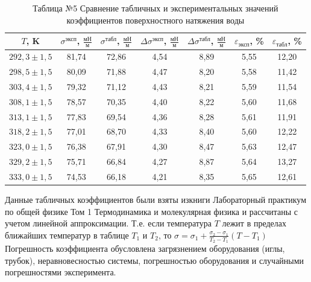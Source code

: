 \documentclass[a4paper]{article}
\begin{document}
\begin{table}[h!] 
	\caption{Таблица №5 Сравнение табличных и экспериментальных значений коэффициентов поверхностного натяжения воды}
	\begin{center}
		\begin{tabular}{|*{7}{c|}}
			\hline
			 $T$, K & $\sigma^{\text{эксп}}$, $\frac{\text{мН}}{\text{м}}$ & $\sigma^{\text{табл}}$, $\frac{\text{мН}}{\text{м}}$ & $\Delta \sigma^{\text{эксп}}$, $\frac{\text{мН}}{\text{м}}$ & $\Delta \sigma^{\text{табл}}$, $\frac{\text{мН}}{\text{м}}$ & $\varepsilon_{\text{эксп}}$, \% & $\varepsilon_{\text{табл}}$, \%\\ \hline
			$292,3\pm 1,5$& 81,74&	72,86&	4,54&	8,89&	5,55&	12,20\\ \hline
			$298,5\pm 1,5$& 80,09&	71,88&	4,47&	8,20&	5,58&	11,42\\ \hline
			$303,4\pm 1,5$& 79,32&	71,12&	4,43&	8,21&	5,59&	11,54\\ \hline
			$308,1\pm 1,5$&78,57&	70,35&	4,40&	8,22&	5,60&	11,68\\ \hline
			$313,1\pm 1,5$& 77,83&	69,54&	4,36&	8,28&	5,61&	11,91\\ \hline
			$318,2\pm 1,5$& 77,01&	68,70&	4,33&	8,40&	5,60&	12,22\\ \hline
			$323,0\pm 1,5$& 76,38&	67,91&	4,30&	8,47&	5,63&	12,47\\ \hline
			$329,2\pm 1,5$& 75,71&	66,84&	4,27&	8,87&	5,64&	13,27\\ \hline
			$333,0\pm 1,5$& 74,53&	66,18&	4,21&	8,35&	5,65&	12,61\\ \hline
		\end{tabular}
	\end{center}
\end{table}
Данные табличных коэффициентов были взяты изкниги Лабораторный практикум по общей физике Том 1 Термодинамика и молекулярная физика и рассчитаны с учетом линейной аппроксимации. Т.е. если температура $T$ лежит в пределах ближайших температур в таблице $T_1$ и $T_2$, то $\sigma = \sigma_1 + \frac{\sigma_2 - \sigma_1}{T_2 - T_1}(T - T_1)$
Погрешность коэффициента обусловлена загрязнением оборудования (иглы, трубок), неравновесностью системы, погрешностью оборудования и случайными погрешностями эксперимента.
\end{document}
